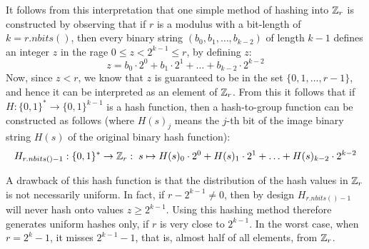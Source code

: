 It follows from this interpretation that one simple method of hashing into $\mathbb{Z}_r$ is constructed by observing that if $r$ is a modulus with a bit-length of $k=r.nbits()$, then every binary string $(b_0,b_1,\ldots,b_{k-2})$ of length $k-1$ defines an integer $z$ in the rage $0\leq z < 2^{k-1}\leq r $, by defining $z$:
\begin{equation}
z = b_0\cdot 2^0 + b_1\cdot 2^1 + \ldots + b_{k-2}\cdot 2^{k-2}
\end{equation}
Now, since $z<r$, we know that $z$ is guaranteed to be in the set $\{0,1,\ldots,r-1\}$, and hence it can be interpreted as an element of $\mathbb{Z}_r$. From this it follows that if $H:\{0,1\}^*\to\{0,1\}^{k-1}$ is a hash function, then a hash-to-group function can be constructed as follows (where $H(s)_j$ means the $j$-th bit of the image binary string $H(s)$ of the original binary hash function):
\begin{equation}\label{eq:hash-Zr}
H_{r.nbits()-1}: \{0,1\}^* \to \mathbb{Z}_r: \; s \mapsto
H(s)_0\cdot 2^0 + H(s)_1\cdot 2^1 + \ldots + H(s)_{k-2}\cdot 2^{k-2}
\end{equation}

A drawback of this hash function is that the distribution of the hash values in $\mathbb{Z}_r$ is not necessarily uniform. In fact, if $r-2^{k-1}\neq 0$, then by design $H_{r.nbits()-1}$ will never hash onto values $z\geq 2^{k-1}$. Using this hashing method therefore generates uniform hashes only, if $r$ is very close to $2^{k-1}$. In the worst case, when $r=2^k-1$, it misses $2^{k-1}-1$, that is, almost half of all elements, from $\mathbb{Z}_r$.

